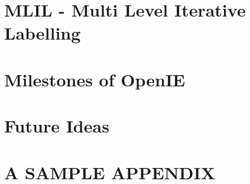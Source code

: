 \documentclass[BTech]{iitddiss}
\begin{document}

\chapter{MLIL - Multi Level Iterative Labelling}
\label{chap:mlil}



\chapter{Milestones of OpenIE}
\label{chap:milestones}



\chapter{Future Ideas}
\label{chap:future_ideas}



\appendix

\chapter{A SAMPLE APPENDIX}



\begin{singlespace}
  
\end{singlespace}



\listofpapers

\end{document}
